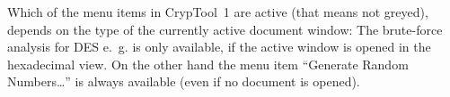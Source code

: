Which of the menu items in CrypTool~1 are active (that means not greyed),
depends on the type of the currently active document window:
The brute-force analysis for DES e.~g. is only
available, if the active window is opened in the hexadecimal view. 
On the other hand the menu item ``Generate Random Numbers\dots''
is always available (even if no document is opened).



\clearpage
\setlength{\hoffset}{-20mm}
\begin{figure}[hb]
\begin{center}
\vspace{-30pt}
\end{center}
\end{figure}
\clearpage
\setlength{\hoffset}{0mm}



